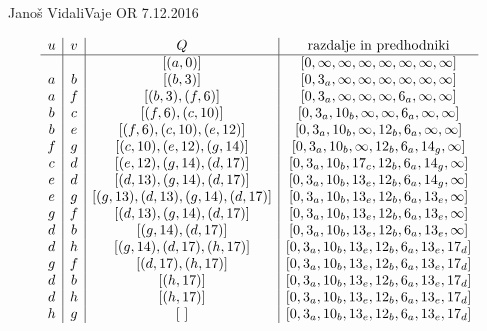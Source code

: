 \begin{naloga}{Janoš Vidali}{Vaje OR 7.12.2016}
\begin{odgovor}
\begin{tabela}[p]
$$
\begin{array}{c|c|c|c}
u & v & Q & \text{razdalje in predhodniki} \\ \hline
  &   & [(a,0)]  & [0, \infty, \infty, \infty, \infty, \infty, \infty, \infty] \\
a & b & [(b, 3)]  & [0, 3_a, \infty, \infty, \infty, \infty, \infty, \infty] \\
a & f & [(b, 3), (f, 6)]  & [0, 3_a, \infty, \infty, \infty, 6_a, \infty, \infty] \\
b & c & [(f, 6), (c, 10)]  & [0, 3_a, 10_b, \infty, \infty, 6_a, \infty, \infty] \\
b & e & [(f, 6), (c, 10), (e, 12)]  & [0, 3_a, 10_b, \infty, 12_b, 6_a, \infty, \infty] \\
f & g & [(c, 10), (e, 12), (g, 14)]  & [0, 3_a, 10_b, \infty, 12_b, 6_a, 14_g, \infty] \\
c & d & [(e, 12), (g, 14), (d, 17)]  & [0, 3_a, 10_b, 17_c, 12_b, 6_a, 14_g, \infty] \\
e & d & [(d, 13), (g, 14), (d, 17)]  & [0, 3_a, 10_b, 13_e, 12_b, 6_a, 14_g, \infty] \\
e & g & [(g, 13), (d, 13), (g, 14), (d, 17)]  & [0, 3_a, 10_b, 13_e, 12_b, 6_a, 13_e, \infty] \\
g & f & [(d, 13), (g, 14), (d, 17)]  & [0, 3_a, 10_b, 13_e, 12_b, 6_a, 13_e, \infty] \\
d & b & [(g, 14), (d, 17)]  & [0, 3_a, 10_b, 13_e, 12_b, 6_a, 13_e, \infty] \\
d & h & [(g, 14), (d, 17), (h, 17)]  & [0, 3_a, 10_b, 13_e, 12_b, 6_a, 13_e, 17_d] \\
g & f & [(d, 17), (h, 17)]  & [0, 3_a, 10_b, 13_e, 12_b, 6_a, 13_e, 17_d] \\
d & b & [(h, 17)]  & [0, 3_a, 10_b, 13_e, 12_b, 6_a, 13_e, 17_d] \\
d & h & [(h, 17)]  & [0, 3_a, 10_b, 13_e, 12_b, 6_a, 13_e, 17_d] \\
h & g & [\ ]  & [0, 3_a, 10_b, 13_e, 12_b, 6_a, 13_e, 17_d]
\end{array}
$$
\end{tabela}

\begin{slika}[p]
\end{slika}
\end{odgovor}
\end{naloga}
